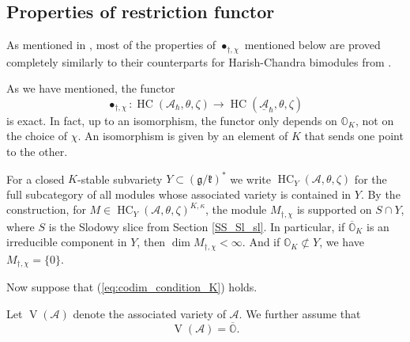 \documentclass[12pt]{amsart}
\newcommand{\A}{\mathcal{A}}
\newcommand{\g}{\mathfrak{g}}
\newcommand{\Orb}{\mathbb{O}}
\newcommand{\kf}{\mathfrak{k}}
\newcommand{\HC}{\operatorname{HC}}
\theoremstyle{definition}
\numberwithin{equation}{section}
\begin{document}

\subsection{Properties of restriction functor}\label{SS_Prop_restr}
As mentioned in \cite[Section 6.1]{Wdim}, most of the properties of $\bullet_{\dagger,\chi}$
mentioned below are proved completely similarly to their counterparts for
Harish-Chandra bimodules from \cite[Sections 3.3,3.4,4]{HC}.

As we have mentioned, the functor $$\bullet_{\dagger,\chi}:
\HC(\A_\hbar,\theta,\zeta)\rightarrow\HC(\underline{\A}_\hbar,\theta,\zeta)$$ is exact. In fact,
up to an isomorphism, the functor only depends on $\Orb_K$, not on the choice of
$\chi$. An isomorphism is given by an element of $K$ that sends one point to the other.

For a closed $K$-stable subvariety $Y\subset (\g/\kf)^*$ we write
$\HC_Y(\A,\theta,\zeta)$ for the full subcategory of all modules whose associated
variety is contained in $Y$. By the construction, for $M\in \HC_Y(\A,\theta,\zeta)^{K,\kappa}$,
the module $M_{\dagger,\chi}$ is supported on $S\cap Y$, where $S$ is the Slodowy slice from  
Section \ref{SS_Sl_sl}. In particular, if
$\overline{\Orb}_K$ is an irreducible component in $Y$, then $\dim M_{\dagger,\chi}<\infty$.
And if $\Orb_K\not \subset Y$, we have $M_{\dagger,\chi}=\{0\}$.

Now suppose that (\ref{eq:codim_condition_K}) holds.

Let $\operatorname{V}(\A)$ denote the associated variety of $\A$. We further assume that
\begin{equation}\label{eq:assoc_var_condition}
\operatorname{V}(\A)=\overline{\Orb}.
\end{equation}
\end{document}
